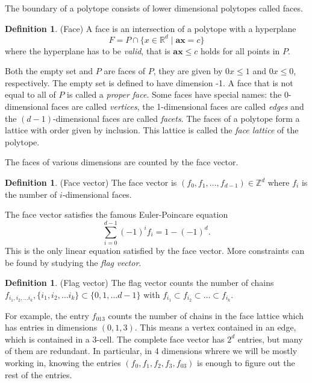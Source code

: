 \documentclass[a4paper,12pt]{book}
\theoremstyle{plain}
\theoremstyle{definition}
\newtheorem{definition}[theorem]{Definition}
\begin{document}
 The boundary 
of a polytope consists of lower dimensional polytopes called faces. 
\begin{definition}
 (Face) A face is an intersection of a polytope with a hyperplane 
\begin{equation}
 F = P \cap \{x \in \mathbb{R}^d \mid \mathbf{a}\mathbf{x} = c\}
\end{equation}
where the hyperplane has to be \textit{valid}, that is $\mathbf{a}\mathbf{x} 
\leq c$ holds for all points in $P$. 

\end{definition}
Both the empty set and $P$ are faces of $P$, they are given by $0x \le 1$ and $0x \le 0$, respectively.
The empty set is defined to have dimension -1.
A face that is not equal to all of $P$ is called a \textit{proper face}.
Some faces have special names: the 0-dimensional faces are called 
\textit{vertices}, the 1-dimensional faces are called \textit{edges} and the 
$(d-1)$-dimensional faces are called \textit{facets}.
 The faces of a polytope 
form a lattice with order given by inclusion. This lattice is called the 
\textit{face lattice} of the polytope.

The faces of various dimensions 
are counted by the face vector.
\begin{definition}
 (Face vector) The face vector is $(f_0, f_1, \dots, f_{d-1}) \in \mathbb{Z}^d$ 
where $f_i$ is 
the number of $i$-dimensional faces.
\end{definition}
The face vector satisfies the famous Euler-Poincare equation
\begin{equation}
 \sum_{i=0}^{d-1} (-1)^i f_i = 1 - (-1)^d.
\end{equation}
This is the only linear equation satisfied by the face vector. More 
constraints can be found by studying the \textit{flag vector}.

\begin{definition}
 (Flag vector) The flag vector counts the number of chains $f_{i_1,i_2,\dots i_k}, \{i_1,i_2,\dots i_k \} \subset \{0,1,\dots d-1\}$
with $f_{i_1} \subset f_{i_2} \subset \dots \subset f_{i_k}$.
\end{definition}

For example, the entry $f_{013}$ counts the number of chains in the face 
lattice which has entries in dimensions $(0,1,3)$. This means a vertex contained in an
edge, which is contained in a 3-cell. The complete face vector has $2^d$ entries,
but many of them are redundant. In particular, in 4 dimensions whrere we will be mostly working in,
knowing the entries $(f_0, f_1, f_2, f_3, f_{03})$ is enough to figure out the rest of the entries. 
\end{document}
